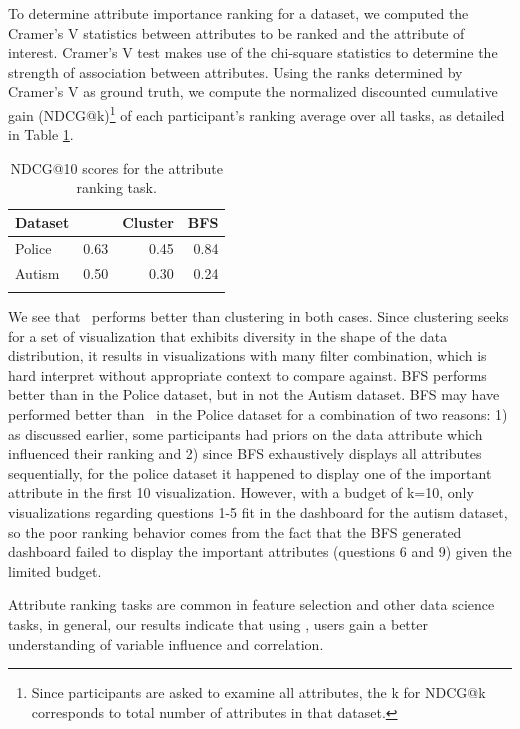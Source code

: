 To determine attribute importance ranking for a dataset, we computed the Cramer's V statistics between attributes to be ranked and the attribute of interest. Cramer's V test makes use of the chi-square statistics to determine the strength of association between attributes. Using the ranks determined by Cramer's V as ground truth, we compute the normalized discounted cumulative gain (NDCG@k)\footnote{Since participants are asked to examine all attributes, the k for NDCG@k corresponds to total number of attributes in that dataset.} of each participant's ranking average over all tasks, as detailed in Table \ref{ndcg_ranking_result}. 
\begin{table}[ht!]
	\centering
	\begin{tabular}{lrrr}
	\hline
	 Dataset   &   \system &   Cluster &   BFS \\
	\hline
	 Police    &      0.63 &      0.45 &  0.84 \\
	 Autism    &      0.50 &      0.30 &  0.24 \\
	\hline
	\label{ndcg_ranking_result}
	\end{tabular}
	\caption{NDCG@10 scores for the attribute ranking task.}
\end{table}
We see that \system\ performs better than clustering in both cases. Since clustering seeks for a set of visualization that exhibits diversity in the shape of the data distribution, it results in visualizations with many filter combination, which is hard interpret without appropriate context to compare against. BFS performs better than \system in the Police dataset, but in not the Autism dataset. BFS may have performed better than \system\ in the Police dataset for a combination of two reasons: 1) as discussed earlier, some participants had priors on the data attribute which influenced their ranking and 2) since BFS exhaustively displays all attributes sequentially, for the police dataset it happened to display one of the important attribute in the first 10 visualization. However, with a budget of k=10, only visualizations regarding questions 1-5 fit in the dashboard for the autism dataset, so the poor ranking behavior comes from the fact that the BFS generated dashboard failed to display the important attributes (questions 6 and 9) given the limited budget. 
\par Attribute ranking tasks are common in feature selection and other data science tasks, in general, our results indicate that using \system, users gain a better understanding of variable influence and correlation. 

